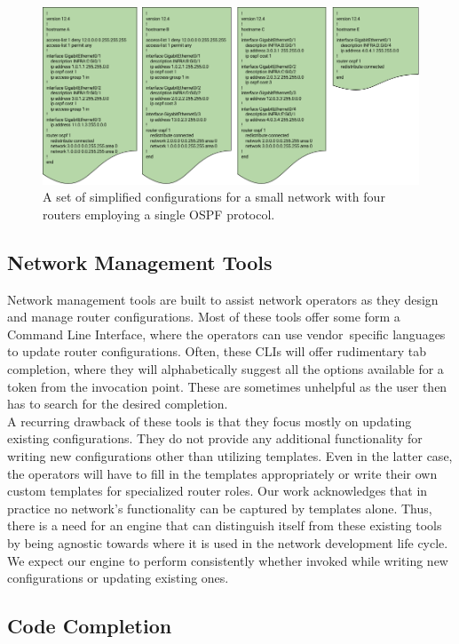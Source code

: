 \begin{figure}[H]
	\centering
	\includegraphics[width=5in]{configexample.png}
	\caption{A set of simplified configurations for a small network with four routers employing a single OSPF protocol.}
\end{figure}

\subsection{Network Management Tools}

Network management tools are built to assist network operators as they design and manage router configurations. Most of these tools offer some form a Command Line Interface, where the operators can use vendor  specific languages to update router configurations. Often, these CLIs will offer rudimentary tab completion, where they will alphabetically suggest all the options available for a token from the invocation point. These are sometimes unhelpful as the user then has to search for the desired completion.\\ 

A recurring drawback of these tools is that they focus mostly on updating existing configurations. They do not provide any additional functionality for writing new configurations other than utilizing templates. Even in the latter case, the operators will have to fill in the templates appropriately or write their own custom templates for specialized router roles. Our work acknowledges that in practice no network’s functionality can be captured by templates alone. Thus, there is a need for an engine that can distinguish itself from these existing tools by being agnostic towards where it is used in the network development life cycle. We expect our engine to perform consistently whether invoked while writing new configurations or updating existing ones.

\subsection{Code Completion}

